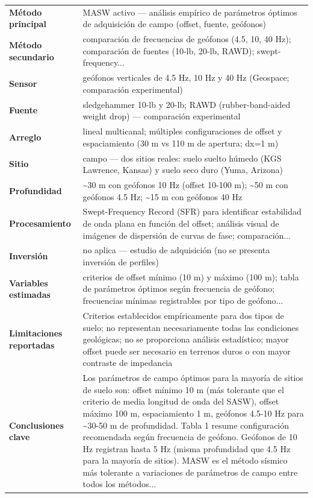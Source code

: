 \begin{center}\scriptsize
\begin{tabularx}{\textwidth}{@{}>{\bfseries}p{3.3cm} X@{}}
\toprule
M\'etodo principal & MASW activo --- análisis empírico de parámetros óptimos de adquisición de campo (offset, fuente, geófonos) \\
M\'etodo secundario & comparación de frecuencias de geófonos (4.5, 10, 40 Hz); comparación de fuentes (10-lb, 20-lb, RAWD); swept-frequency... \\
Sensor & geófonos verticales de 4.5 Hz, 10 Hz y 40 Hz (Geospace; comparación experimental) \\
Fuente & sledgehammer 10-lb y 20-lb; RAWD (rubber-band-aided weight drop) --- comparación experimental \\
Arreglo & lineal multicanal; múltiples configuraciones de offset y espaciamiento (30 m vs 110 m de apertura; dx=1 m) \\
Sitio & campo --- dos sitios reales: suelo suelto húmedo (KGS Lawrence, Kansas) y suelo seco duro (Yuma, Arizona) \\
Profundidad & \textasciitilde{}30 m con geófonos 10 Hz (offset 10-100 m); \textasciitilde{}50 m con geófonos 4.5 Hz; \textasciitilde{}15 m con geófonos 40 Hz \\
Procesamiento & Swept-Frequency Record (SFR) para identificar estabilidad de onda plana en función del offset; análisis visual de imágenes de dispersión de curvas de fase; comparación... \\
Inversi\'on & no aplica --- estudio de adquisición (no se presenta inversión de perfiles) \\
Variables estimadas & criterios de offset mínimo (10 m) y máximo (100 m); tabla de parámetros óptimos según frecuencia de geófono; frecuencias mínimas registrables por tipo de geófono... \\
Limitaciones reportadas & Criterios establecidos empíricamente para dos tipos de suelo; no representan necesariamente todas las condiciones geológicas; no se proporciona análisis estadístico; mayor offset puede ser necesario en terrenos duros o con mayor contraste de impedancia \\
Conclusiones clave & Los parámetros de campo óptimos para la mayoría de sitios de suelo son: offset mínimo 10 m (más tolerante que el criterio de media longitud de onda del SASW), offset máximo 100 m, espaciamiento 1 m, geófonos 4.5-10 Hz para \textasciitilde{}30-50 m de profundidad. Tabla 1 resume configuración recomendada según frecuencia de geófono. Geófonos de 10 Hz registran hasta 5 Hz (misma profundidad que 4.5 Hz para la mayoría de sitios). MASW es el método sísmico más tolerante a variaciones de parámetros de campo entre todos los métodos... \\

\end{tabularx}
\end{center}
